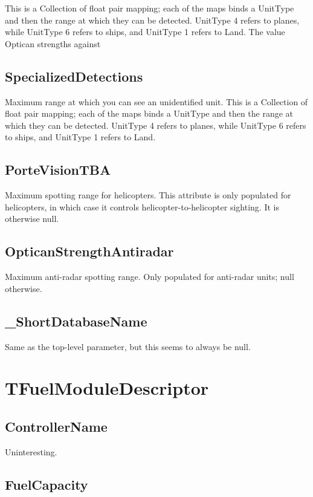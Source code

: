 \documentclass{article}
\begin{document}
This is a Collection of float pair mapping; each of the maps binds a UnitType and then the range at which they can be detected. UnitType 4 refers to planes, while UnitType 6 refers to ships, and UnitType 1 refers to Land. The value Optican strengths against 

\subsection{SpecializedDetections}

Maximum range at which you can see an unidentified unit. This is a Collection of float pair mapping; each of the maps binds a UnitType and then the range at which they can be detected. UnitType 4 refers to planes, while UnitType 6 refers to ships, and UnitType 1 refers to Land.

\subsection{PorteVisionTBA}

Maximum spotting range for helicopters. This attribute is only populated for helicopters, in which case it controls helicopter-to-helicopter sighting. It is otherwise null.

\subsection{OpticanStrengthAntiradar}

Maximum anti-radar spotting range. Only populated for anti-radar units; null otherwise.

\subsection{\_ShortDatabaseName}

Same as the top-level parameter, but this seems to always be null.

\section{TFuelModuleDescriptor}

\subsection{ControllerName}

Uninteresting.

\subsection{FuelCapacity}
\end{document}
